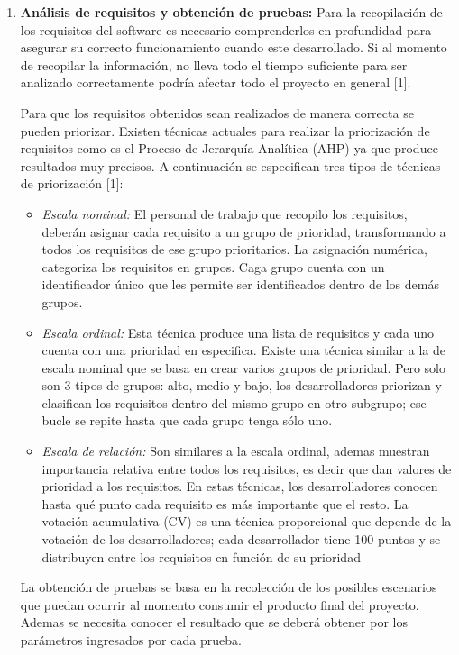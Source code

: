 \begin{enumerate}
	\item \textbf{Análisis de requisitos y obtención de pruebas:} Para la recopilación de los requisitos del software es necesario comprenderlos en profundidad para asegurar su correcto funcionamiento cuando este desarrollado. Si al momento de recopilar la información, no lleva todo el tiempo suficiente para ser analizado correctamente podría afectar todo el proyecto en general [1].
	
	Para que los requisitos obtenidos sean realizados de manera correcta se pueden priorizar. Existen técnicas actuales para realizar la priorización de requisitos como es el Proceso de Jerarquía Analítica (AHP) ya que produce resultados muy precisos. A continuación se especifican  tres tipos de técnicas de priorización [1]:
	
	\begin{itemize}
		\item \textit{Escala nominal: } El personal de trabajo que recopilo los requisitos, deberán asignar cada requisito a un grupo de prioridad, transformando a todos los requisitos de ese grupo prioritarios. La asignación numérica, categoriza los requisitos en grupos. Caga grupo cuenta con un identificador único que les permite ser identificados dentro de los demás grupos. 
		\item \textit{Escala ordinal: } Esta técnica produce una lista de requisitos y cada uno cuenta con una prioridad en especifica. Existe una técnica similar a la de escala nominal que se basa en crear varios grupos de prioridad. Pero solo son 3 tipos de grupos: alto, medio y bajo, los desarrolladores priorizan y clasifican los requisitos dentro del mismo grupo en otro subgrupo; ese bucle se repite hasta que cada grupo tenga sólo uno.
		\item \textit{Escala de relación: }Son similares a la escala ordinal, ademas muestran importancia relativa entre todos los requisitos, es decir que dan valores de prioridad a los requisitos.	En estas técnicas, los desarrolladores conocen hasta qué punto cada requisito es más importante que el resto. La votación acumulativa (CV) es una técnica proporcional que depende de la votación de los desarrolladores; cada desarrollador tiene 100 puntos y se distribuyen entre los requisitos en función de su prioridad 
	\end{itemize}
	
	La obtención de pruebas se basa en la recolección de los posibles escenarios que puedan ocurrir al momento consumir el producto final del proyecto. Ademas se necesita conocer el resultado que se deberá obtener por los parámetros ingresados por cada prueba. 
	 

\end{enumerate}

